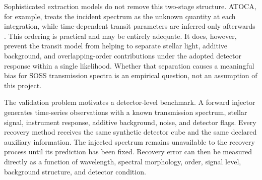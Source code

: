 
Sophisticated extraction models do not remove this two-stage structure.
ATOCA, for example, treats the incident spectrum as the unknown quantity at
each integration, while time-dependent transit parameters are inferred only
afterwards
\citep{DarveauBernierEtAl2022,BellEtAl2022,RadicaEtAl2023}. This ordering is
practical and may be entirely adequate. It does, however, prevent the transit
model from helping to separate stellar light, additive background, and
overlapping-order contributions under the adopted detector response within a
single likelihood. Whether that separation causes a meaningful bias
for SOSS transmission spectra is an empirical question, not an assumption of
this project.


The validation problem motivates a detector-level benchmark. A forward injector
generates time-series observations with a known transmission spectrum,
stellar signal, instrument response, additive background, noise, and detector
flags. Every recovery method receives the same synthetic detector cube and
the same declared auxiliary information. The injected spectrum remains
unavailable to the recovery process until its prediction has been fixed.
Recovery error can then be measured directly as a function of wavelength,
spectral morphology, order, signal level, background structure, and detector
condition.


